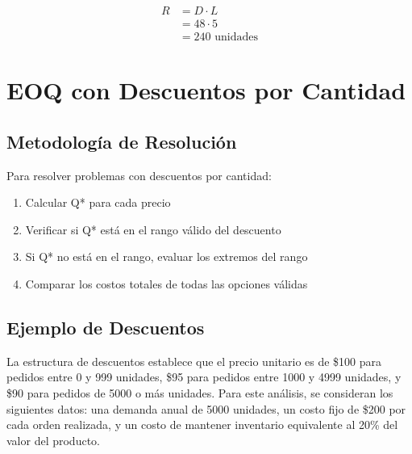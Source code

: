 \documentclass[11pt,a4paper]{article}
\begin{document}
\begin{align*}
R &= D \cdot L \\
  &= 48 \cdot 5 \\
  &= 240 \text{ unidades}
\end{align*}

\section{EOQ con Descuentos por Cantidad}
\subsection{Metodología de Resolución}
Para resolver problemas con descuentos por cantidad:
\begin{enumerate}
    \item Calcular Q* para cada precio
    \item Verificar si Q* está en el rango válido del descuento
    \item Si Q* no está en el rango, evaluar los extremos del rango
    \item Comparar los costos totales de todas las opciones válidas
\end{enumerate}

\subsection{Ejemplo de Descuentos}
La estructura de descuentos establece que el precio unitario es de \$100 para pedidos entre 0 y 999 unidades, \$95 para pedidos entre 1000 y 4999 unidades, y \$90 para pedidos de 5000 o más unidades. Para este análisis, se consideran los siguientes datos: una demanda anual de 5000 unidades, un costo fijo de \$200 por cada orden realizada, y un costo de mantener inventario equivalente al 20\% del valor del producto.
\end{document}
